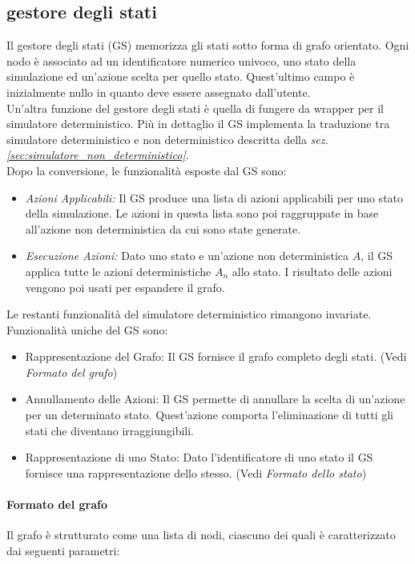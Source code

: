 \documentclass[a4paper, 11pt, titlepage, twoside, openany]{book}
\begin{document}
\subsection{gestore degli stati}
\label{subsubsec: gestore_degli_stati}
Il gestore degli stati (GS) memorizza gli stati sotto forma di grafo orientato. Ogni nodo è associato ad un identificatore numerico univoco, uno stato della simulazione ed un'azione scelta per quello stato. Quest'ultimo campo è inizialmente nullo in quanto deve essere assegnato dall'utente. \\

Un'altra funzione del gestore degli stati è quella di fungere da wrapper per il simulatore deterministico. Più in dettaglio il GS implementa la traduzione tra simulatore deterministico e non deterministico descritta della \textit{sez. \ref{sec:simulatore_non_deterministico}}. \\
Dopo la conversione, le funzionalità esposte dal GS sono:
\begin{itemize}
    \item \textit{Azioni Applicabili:} Il GS produce una lista di azioni applicabili per uno stato della simulazione. Le azioni in questa lista sono poi raggruppate in base all'azione non deterministica da cui sono state generate.
    \item \textit{Esecuzione Azioni:} Dato uno stato e un'azione non deterministica $A$, il GS applica tutte le azioni deterministiche $A_n$ allo stato. I risultato delle azioni vengono poi usati per espandere il grafo. \\
\end{itemize}
Le restanti funzionalità del simulatore deterministico rimangono invariate. \\
Funzionalità uniche del GS sono:
\begin{itemize}
    \item {Rappresentazione del Grafo:} Il GS fornisce il grafo completo degli stati. (Vedi \textit{Formato del grafo})
    \item {Annullamento delle Azioni:} Il GS permette di annullare la scelta di un'azione per un determinato stato. Quest'azione comporta l'eliminazione di tutti gli stati che diventano irraggiungibili.
    \item {Rappresentazione di uno Stato:} Dato l'identificatore di uno stato il GS fornisce una rappresentazione dello stesso. (Vedi \textit{Formato dello stato})
\end{itemize}

\paragraph{Formato del grafo}
Il grafo è strutturato come una lista di nodi, ciascuno dei quali è caratterizzato dai seguenti parametri:
\end{document}

